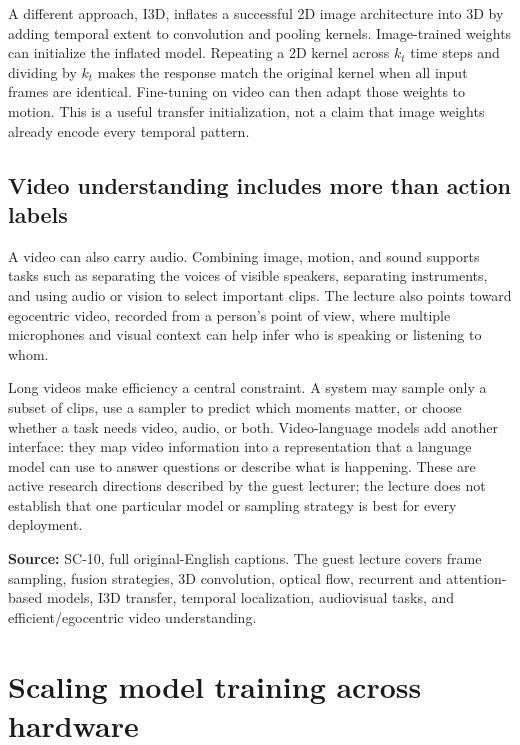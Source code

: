 A different approach, I3D, inflates a successful 2D image architecture into 3D by adding temporal extent to convolution and pooling kernels. Image-trained weights can initialize the inflated model. Repeating a 2D kernel across \(k_t\) time steps and dividing by \(k_t\) makes the response match the original kernel when all input frames are identical. Fine-tuning on video can then adapt those weights to motion. This is a useful transfer initialization, not a claim that image weights already encode every temporal pattern.

\subsection{Video understanding includes more than action labels}\label{04-visual-computing-ii-ch031-video-understanding-includes-more-than-action-labels}

\hypertarget{04-visual-computing-ii-ch031-video-understanding-includes-more-than-action-labels}{}

A video can also carry audio. Combining image, motion, and sound supports tasks such as separating the voices of visible speakers, separating instruments, and using audio or vision to select important clips. The lecture also points toward egocentric video, recorded from a person's point of view, where multiple microphones and visual context can help infer who is speaking or listening to whom.

Long videos make efficiency a central constraint. A system may sample only a subset of clips, use a sampler to predict which moments matter, or choose whether a task needs video, audio, or both. Video-language models add another interface: they map video information into a representation that a language model can use to answer questions or describe what is happening. These are active research directions described by the guest lecturer; the lecture does not establish that one particular model or sampling strategy is best for every deployment.

\textbf{Source:} SC-10, full original-English captions. The guest lecture covers frame sampling, fusion strategies, 3D convolution, optical flow, recurrent and attention-based models, I3D transfer, temporal localization, audiovisual tasks, and efficient/egocentric video understanding.

\section{Scaling model training across hardware}\label{04-visual-computing-ii-ch031-scaling-model-training-across-hardware}

